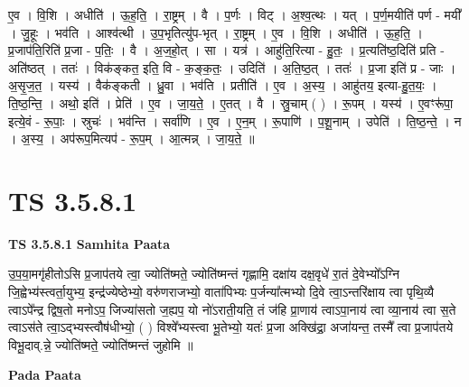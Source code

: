 \documentclass[17pt]{extarticle}
\begin{document}
ए॒व । वि॒शि । अधीति॑ । ऊ॒ह॒ति॒ । रा॒ष्ट्रम् । वै । प॒र्णः । विट् । अ॒श्व॒त्थः । यत् । प॒र्ण॒मयीति॑ पर्ण - मयी᳚ । जु॒हूः । भव॑ति । आश्व॑त्थी । उ॒प॒भृतित्यु॑प-भृत् । रा॒ष्ट्रम् । ए॒व । वि॒शि । अधीति॑ । ऊ॒ह॒ति॒ । प्र॒जाप॑ति॒रिति॑ प्र॒जा - प॒तिः॒ । वै । अ॒ज॒हो॒त् । सा । यत्र॑ । आहु॑ति॒रित्या - हु॒तः॒ । प्र॒त्यति॑ष्ठ॒दिति॑ प्रति - अति॑ष्ठत् । ततः॑ । विक॑ङ्कत॒ इति॒ वि - क॒ङ्क॒तः॒ । उदिति॑ । अ॒ति॒ष्ठ॒त् । ततः॑ । प्र॒जा इति॑ प्र - जाः । अ॒सृ॒ज॒त॒ । यस्य॑ । वैक॑ङ्कती । ध्रु॒वा । भव॑ति । प्रतीति॑ । ए॒व । अ॒स्य॒ । आहु॑तय॒ इत्या-हु॒त॒यः॒ । ति॒ष्ठ॒न्ति॒ । अथो॒ इति॑ । प्रेति॑ । ए॒व । जा॒य॒ते॒ । ए॒तत् । वै । स्रु॒चाम् ( ) । रू॒पम् । यस्य॑ । ए॒वꣳरू॑पा॒ इत्ये॒वं - रू॒पाः॒ । स्रुचः॑ । भव॑न्ति । सर्वा॑णि । ए॒व । ए॒न॒म् । रू॒पाणि॑ । प॒शू॒नाम् । उपेति॑ । ति॒ष्ठ॒न्ते॒ । न । अ॒स्य॒ । अप॑रूप॒मित्यप॑ - रू॒प॒म् । आ॒त्मन्न् । जा॒य॒ते॒ ॥  \newline




\section*{ TS 3.5.8.1 }

\textbf{TS 3.5.8.1 } \newline
\textbf{Samhita Paata} \newline

उ॒प॒या॒मगृ॑हीतोऽसि प्र॒जाप॑तये त्वा॒ ज्योति॑ष्मते॒ ज्योति॑ष्मन्तं गृह्णामि॒ दक्षा॑य दक्ष॒वृधे॑ रा॒तं दे॒वेभ्यो᳚ऽग्नि जि॒ह्वेभ्य॑स्त्वर्ता॒युभ्य॒ इन्द्र॑ज्येष्ठेभ्यो॒ वरु॑णराजभ्यो॒ वाता॑पिभ्यः प॒र्जन्या᳚त्मभ्यो दि॒वे त्वा॒ऽन्तरि॑क्षाय त्वा पृथि॒व्यै त्वाऽपे᳚न्द्र द्विष॒तो मनोऽप॒ जिज्या॑सतो ज॒ह्यप॒ यो नो॑ऽराती॒यति॒ तं ज॑हि प्रा॒णाय॑ त्वाऽपा॒नाय॑ त्वा व्या॒नाय॑ त्वा स॒ते त्वाऽस॑ते त्वा॒ऽद्भ्यस्त्वौष॑धीभ्यो॒ ( ) विश्वे᳚भ्यस्त्वा भू॒तेभ्यो॒ यतः॑ प्र॒जा अक्खि॑द्रा॒ अजा॑यन्त॒ तस्मै᳚ त्वा प्र॒जाप॑तये विभू॒दाव्.न्ने॒ ज्योति॑ष्मते॒ ज्योति॑ष्मन्तं जुहोमि ॥ \newline

\textbf{Pada Paata} \newline
\end{document}

